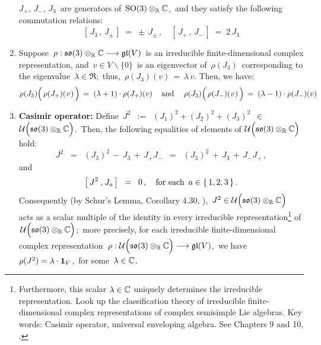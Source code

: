 \begin{proposition}
\begin{enumerate}
	$J_{+},\, J_{-},\, J_{3}$\, are generators of \,$\textnormal{SO}(3) \otimes_{\mathbb{R}} \mathbb{C}$,\, and
	they satisfy the following commutation relations:
	\begin{equation*}
	\left[\,J_{3}\,,\,J_{\pm}\,\right] \;=\; \pm\,J_{\pm}\,,
	\quad
	\left[\,J_{+}\,,\,J_{-}\,\right] \;=\; 2\,J_{3}
	\end{equation*}
\item
	Suppose
	\,$\rho : \mathfrak{so}(3) \otimes_{\mathbb{R}} \mathbb{C} \longrightarrow \mathfrak{gl}(V)$\,
	is an irreducible finite-dimensional complex representation, and
	\,$v \in V \backslash\{0\}$\, is an eigenvector of \,$\rho(J_{3})$\,
	corresponding to the eigenvalue \,$\lambda \in \Re$;\, thus, \,$\rho(J_{3})(v) \,=\, \lambda\,v$.
	Then, we have:
	\begin{equation*}
	\rho(J_{3})\!\left(\,\rho(J_{+})(\overset{{\color{white}-}}{v})\,\right) \, = \; (\lambda+1)\cdot\rho(J_{+})(v)\,
	\quad\textnormal{and}\quad\;
	\rho(J_{3})\!\left(\,\rho(J_{-})(\overset{{\color{white}-}}{v})\,\right) \, = \; (\lambda-1)\cdot\rho(J_{-})(v)
	\end{equation*}
\item
	\textbf{Casimir operator:}\;\;
	Define
	\,$J^{2}$
	\,$:=$\,
	$(J_{1})^{2} + (J_{2})^{2} + (J_{3})^{2}$
	\,$\in$\
	 $\mathcal{U}\!\left(\mathfrak{so}(3) \overset{{\color{white}.}}{\otimes_{\Re}} \C\right)$.\,
	Then, the following equalities of elements of
	\;$\mathcal{U}\!\left(\mathfrak{so}(3) \overset{{\color{white}.}}{\otimes_{\Re}} \C\right)$
	hold:
	\begin{equation*}
	J^{2}
	\;\; =\;\;
		(J_{3})^{2} \,-\, J_{3} \,+\, J_{+}J_{-}
	\;\; =\;\;
		(J_{3})^{2} \,+\, J_{3} \,+\, J_{-}J_{+}\,,
	\end{equation*}
	and
	\begin{equation*}
	\left[\,J^{2}\,\overset{{\color{white}1}}{,}\,J_{a}\,\right]
	\;\; = \;\;
		0\,,
	\quad
	\textnormal{for each \,$a \in \{\,1,2,3\,\}$}\,.
	\end{equation*}
	Consequently (by Schur's Lemma, Corollary 4.30, \cite{Hall2015}), 
	\,$J^{2} \in \mathcal{U}\!\left(\mathfrak{so}(3) \overset{{\color{white}.}}{\otimes_{\Re}} \C\right)$\,
	acts as a scalar multiple of the identity in every irreducible
	representation\footnote{Furthermore, this scalar $\lambda \in \mathbb{C}$ uniquely determines
	the irreducible representation.
	Look up the classification theory of irreducible finite-dimensional complex representations
	of complex semisimple Lie algebras.
	Key words: Casimir operator, universal enveloping algebra. See Chapters 9 and 10, \cite{Hall2015}.}
	of \,$\mathcal{U}\!\left(\mathfrak{so}(3) \overset{{\color{white}.}}{\otimes_{\Re}} \C\right)$;\,
	more precisely, for each irreducible finite-dimensional complex representation
	\,$\rho : \mathcal{U}\!\left(\mathfrak{so}(3) \overset{{\color{white}.}}{\otimes_{\Re}} \C\right) \longrightarrow \mathfrak{gl}(V)$,\,
	we have \,$\rho(J^{2}) = \lambda \cdot \textnormal{\textbf{1}}_{V}$,\,
	for some \,$\lambda \in \mathbb{C}$.
\end{enumerate}
\end{proposition}

